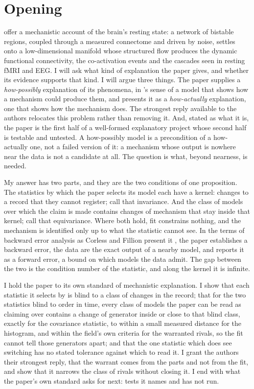 \documentclass[11pt]{article}
\begin{document}
\section*{Opening}
\textcite{fousek2024} offer a mechanistic account of the brain's resting state: a network of bistable regions, coupled through a measured connectome and driven by noise, settles onto a low-dimensional manifold whose structured flow produces the dynamic functional connectivity, the co-activation events and the cascades seen in resting fMRI and EEG. I will ask what kind of explanation the paper gives, and whether its evidence supports that kind. I will argue three things. The paper supplies a \emph{how-possibly} explanation of its phenomena, in \textcite{craver2006}'s sense of a model that shows how a mechanism could produce them, and presents it as a \emph{how-actually} explanation, one that shows how the mechanism does. The strongest reply available to the authors relocates this problem rather than removing it. And, stated as what it is, the paper is the first half of a well-formed explanatory project whose second half is testable and untested. A how-possibly model is a precondition of a how-actually one, not a failed version of it: a mechanism whose output is nowhere near the data is not a candidate at all. The question is what, beyond nearness, is needed.

My answer has two parts, and they are the two conditions of one proposition. The statistics by which the paper selects its model each have a kernel: changes to a record that they cannot register; call that invariance. And the class of models over which the claim is made contains changes of mechanism that stay inside that kernel; call that equivariance. Where both hold, fit constrains nothing, and the mechanism is identified only up to what the statistic cannot see. In the terms of backward error analysis as Corless and Fillion present it \parencite{corless2016,fillion2014}, the paper establishes a backward error, the data are the exact output of a nearby model, and reports it as a forward error, a bound on which models the data admit. The gap between the two is the condition number of the statistic, and along the kernel it is infinite.

I hold the paper to its own standard of mechanistic explanation. I show that each statistic it selects by is blind to a class of changes in the record; that for the two statistics blind to order in time, every class of models the paper can be read as claiming over contains a change of generator inside or close to that blind class, exactly for the covariance statistic, to within a small measured distance for the histogram, and within the field's own criteria for the warranted rivals, so the fit cannot tell those generators apart; and that the one statistic which does see switching has no stated tolerance against which to read it. I grant the authors their strongest reply, that the warrant comes from the parts and not from the fit, and show that it narrows the class of rivals without closing it. I end with what the paper's own standard asks for next: tests it names and has not run.
\end{document}
